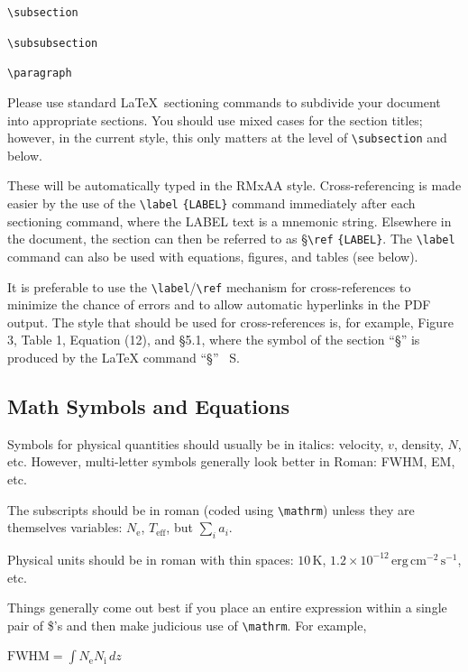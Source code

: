 \documentclass[9pt,twoside]{rmaa-rho-class/rmaa-rho}
\newcommand{\CS}[1]{\texttt{\textbackslash #1}}
\newenvironment{Example}
{\begin{list}{}{\setlength{\leftmargin}{10pt}\setlength{\rightmargin}{10pt}}%
  \item[]\itshape}
  {\end{list}}
\begin{document}
    \CS{subsection}
    
    \CS{subsubsection}
    
    \CS{paragraph}
    \bigskip

    Please use standard \LaTeX\ sectioning commands to subdivide your document into appropriate sections. You should use mixed cases for the section titles; however, in the current style, this only matters at the level of \CS{subsection} and below.

    These will be automatically typed in the RMxAA style. Cross-referencing is made easier by the use of the \CS{label} \verb+{LABEL}+ command immediately after each sectioning command, where the LABEL text is a mnemonic string. Elsewhere in the document, the section can then be referred to as \S \CS{ref} \verb+{LABEL}+. The \CS{label} command can also be used with equations, figures, and tables (see below). 

    It is preferable to use the \CS{label}/\CS{ref} mechanism for cross-references to minimize the chance of errors and to allow automatic hyperlinks in the PDF output. The style that should be used for cross-references is, for example, Figure 3, Table 1, Equation (12), and \S 5.1, where the symbol of the section “§” is produced by the \LaTeX{} command “\S” \ S.

    \subsection{Math Symbols and Equations} \label{sec:math}

        Symbols for physical quantities should usually be in italics: velocity, $v$, density, $N$, etc. However, multi-letter symbols generally look better in Roman: FWHM, EM, etc. 
    
        The subscripts should be in roman (coded using \CS{mathrm}) unless they are themselves variables: $N_\mathrm{e}$, $T_\mathrm{eff}$, but $\sum_i a_i$. 
        
        Physical units should be in roman with thin spaces: $10\,\mathrm{K}$, $1.2\times10^{-12}\,\mathrm{erg\,cm^{-2}\,s^{-1}}$, etc. 
    
        Things generally come out best if you place an entire expression within a single pair of \$'s and then make judicious use of \CS{mathrm}. For example,
    
        \begin{Example}
          $ \mathrm{FWHM} = \int N_\mathrm{e} N_\mathrm{i} \, dz $ 
        \end{Example}
    
\end{document}
